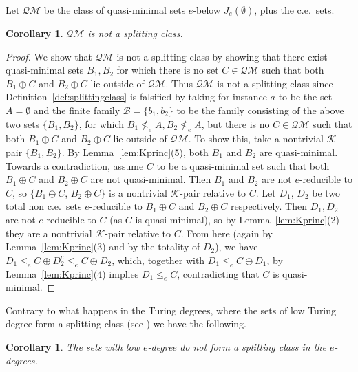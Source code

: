 \documentclass[11pt]{amsart}
\newtheorem{corollary}[theorem]{Corollary}
\begin{document}
Let $\mathcal{QM}$ be the class of quasi-minimal sets $e$-below 
$J_e(\emptyset)$, plus the c.e.\ sets. 

\begin{corollary}\label{cor:qm}
$\mathcal{QM}$ is not a splitting class. 
\end{corollary}

\begin{proof}
We show that $\mathcal{QM}$ is not a splitting class by showing that there 
exist quasi-minimal sets $B_1, B_2$ for which there is no set $C 
\in \mathcal{QM}$ such that both $B_1 \oplus C$ and $B_2 \oplus C$ lie 
outside of $\mathcal{QM}$. Thus $\mathcal{QM}$ is not a splitting class since 
Definition~\ref{def:splittingclass} is falsified by taking for instance $a$ 
to be the set $A= \emptyset$ and the finite family $\mathcal{B}=\{b_1, 
b_2\}$ to be the family consisting of the above two sets $\{B_1, B_2\}$, for 
which $B_1\nleq_e A, B_2 \nleq_e A$, but there is no $C\in \mathcal{QM}$ such 
that both $B_1 \oplus C$ and $B_2 \oplus C$ lie outside of $\mathcal{QM}$. To 
show this, take a nontrivial $\mathcal{K}$-pair $\{B_1, B_2\}$. 
By Lemma~\ref{lem:Kprinc}(5), both $B_1$ and $B_2$ are quasi-minimal. Towards 
a contradiction, assume $C$ to be a quasi-minimal set such that both $B_1 
\oplus C$ and $B_2 \oplus C$ are not quasi-minimal. Then $B_1$ and $B_2$ are 
not $e$-reducible to $C$, so $\{B_1 \oplus C$, $B_2 \oplus C\}$ is a nontrivial 
$\mathcal{K}$-pair relative to $C$. Let $D_1$, $D_2$ be two total non c.e.\ 
sets $e$-reducible to $B_1 \oplus C$ and $B_2 \oplus C$ respectively. Then 
$D_1, D_2$ are not $e$-reducible to $C$ (as $C$ is quasi-minimal), so by 
Lemma~\ref{lem:Kprinc}(2) they are a nontrivial $\mathcal{K}$-pair relative 
to $C$. From here (again by Lemma~\ref{lem:Kprinc}(3) and by the totality of 
$D_2$), we have $D_1 \leq_e C \oplus D_2^c \leq_e C \oplus D_2$, which, 
together with $D_1 \leq_e C \oplus D_1$, by Lemma~\ref{lem:Kprinc}(4) implies 
$D_1 \leq_e C$, contradicting that $C$ is quasi-minimal. 
\end{proof}

Contrary to what happens in the Turing degrees, where the sets of low Turing 
degree form a splitting class (see \cite{Kuyper-Medvedev}) we have the 
following. 

\begin{corollary}\label{cor:low}
The sets with low $e$-degree do not form a splitting class in the 
$e$-degrees. 
\end{corollary}
\end{document}

